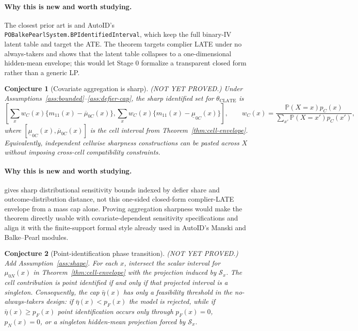 \documentclass[11pt]{article}
\renewcommand{\Pr}{\mathbb{P}}
\theoremstyle{definition}
\theoremstyle{plain}
\newtheorem{conjecture}{Conjecture}
\theoremstyle{remark}
\begin{document}
\paragraph{Why this is new and worth studying.}
The closest prior art is \citet{BalkePearl1997} and AutoID's \texttt{POBalkePearlSystem.BPIdentifiedInterval}, which keep the full binary-IV latent table and target the ATE.  The theorem targets complier LATE under no always-takers and shows that the latent table collapses to a one-dimensional hidden-mean envelope; this would let Stage 0 formalize a transparent closed form rather than a generic LP.

\begin{conjecture}[Covariate aggregation is sharp]\label{conj:aggregate-sharpness}
(NOT YET PROVED.)  Under Assumptions~\ref{ass:bounded}--\ref{ass:defier-cap}, the sharp identified set for \(\theta_{\mathrm{CLATE}}\) is
\[
\left[
\sum_x w_C(x)\{m_{11}(x)-\overline\mu_{0C}(x)\},
\sum_x w_C(x)\{m_{11}(x)-\underline\mu_{0C}(x)\}
\right],
\qquad
w_C(x)=\frac{\Pr(X=x)p_C(x)}{\sum_{x'}\Pr(X=x')p_C(x')},
\]
where \([\underline\mu_{0C}(x),\overline\mu_{0C}(x)]\) is the cell interval from Theorem~\ref{thm:cell-envelope}.  Equivalently, independent cellwise sharpness constructions can be pasted across \(X\) without imposing cross-cell compatibility constraints.
\end{conjecture}
\paragraph{Why this is new and worth studying.}
\citet{Noack2021} gives sharp distributional sensitivity bounds indexed by defier share and outcome-distribution distance, not this one-sided closed-form complier-LATE envelope from a mass cap alone.  Proving aggregation sharpness would make the theorem directly usable with covariate-dependent sensitivity specifications and align it with the finite-support formal style already used in AutoID's Manski and Balke--Pearl modules.

\begin{conjecture}[Point-identification phase transition]\label{conj:phase-transition}
(NOT YET PROVED.)  Add Assumption~\ref{ass:shape}.  For each \(x\), intersect the scalar interval for \(\mu_{0N}(x)\) in Theorem~\ref{thm:cell-envelope} with the projection induced by \(\mathcal{S}_x\).  The cell contribution is point identified if and only if that projected interval is a singleton.  Consequently, the cap \(\bar\eta(x)\) has only a feasibility threshold in the no-always-takers design: if \(\bar\eta(x)<p_F(x)\) the model is rejected, while if \(\bar\eta(x)\ge p_F(x)\) point identification occurs only through \(p_F(x)=0\), \(p_N(x)=0\), or a singleton hidden-mean projection forced by \(\mathcal{S}_x\).
\end{conjecture}
\end{document}
